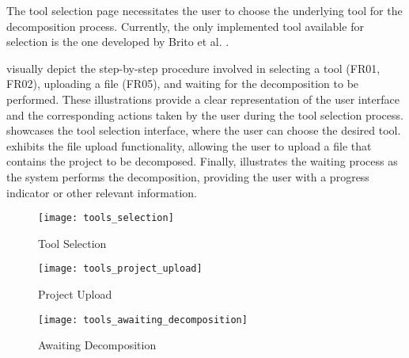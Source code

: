 The tool selection page necessitates the user to choose the underlying tool for
the decomposition process. Currently, the only implemented tool available for
selection is the one developed by Brito et al.
.

visually depict the step-by-step procedure involved in selecting a tool (FR01,
FR02), uploading a file (FR05), and waiting for the decomposition to be
performed. These illustrations provide a clear representation of the user
interface and the corresponding actions taken by the user during the tool
selection process.  showcases the tool selection
interface, where the user can choose the desired tool.
 exhibits the file upload functionality, allowing the
user to upload a file that contains the project to be decomposed. Finally,
 illustrates the waiting process as the system
performs the decomposition, providing the user with a progress indicator or
other relevant information.

\begin{figure*}[!htb]
  \caption{Tool Selection}
  \label{fig:tool_selection}
  \centering
  \texttt{[image: tools\_selection]}
\end{figure*}
\begin{figure*}[!htb]
  \caption{Project Upload}
  \label{fig:project_upload}
  \centering
  \texttt{[image: tools\_project\_upload]}
\end{figure*}
\begin{figure*}[!htb]
  \caption{Awaiting Decomposition}
  \label{fig:awaiting_decomposition}
  \centering
  \texttt{[image: tools\_awaiting\_decomposition]}
\end{figure*}
